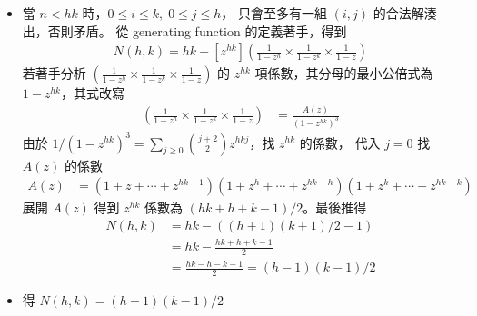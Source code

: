 \documentclass[11pt,fleqn]{article}
\begin{document}
\begin{itemize}
	\item 當 $n < hk$ 時，$0 \le i \le k, \; 0 \le j \le h$，
		只會至多有一組 $(i,j)$ 的合法解湊出，否則矛盾。
		從 generating function 的定義著手，得到 
		\begin{align*}
			N(h, k) = hk - [z^{hk}]\left(\frac{1}{1-z^h}\times\frac{1}{1-z^k}\times\frac{1}{1-z}\right)
		\end{align*}
		若著手分析 $\left(\frac{1}{1-z^h}\times\frac{1}{1-z^k}\times\frac{1}{1-z}\right)$ 的 $z^{hk}$ 項係數，其分母的最小公倍式為 $1-z^{hk}$，其式改寫
		\begin{align*}
			\left(\frac{1}{1-z^h}\times\frac{1}{1-z^k}\times\frac{1}{1-z}\right)
				&= \frac{A(z)}{(1 - z^{hk})^3} 
		\end{align*}
		由於 $1/(1 - z^{hk})^3 = \sum_{j \ge 0} \binom{j+2}{2} z^{hkj}$，找 $z^{hk}$ 的係數，
		代入 $j = 0$ 找 $A(z)$ 的係數
		\begin{align*}
			A(z) &= (1 + z + \cdots + z^{hk-1})
					(1 + z^h + \cdots + z^{hk - h}) 
					(1 + z^k + \cdots + z^{hk - k})
		\end{align*}
		展開 $A(z)$ 得到 $z^{hk}$ 係數為 $(hk + h + k - 1)/2$。最後推得
		\begin{align*}
			N(h, k) &= hk - \left( (h+1)(k+1)/2 - 1 \right) \\
				&= hk - \frac{hk + h + k - 1}{2} \\
				&= \frac{hk - h - k - 1}{2} = (h-1)(k-1)/2
		\end{align*}
	\item 得 $N(h, k) = (h-1)(k-1)/2$
\end{itemize}
\end{document}
